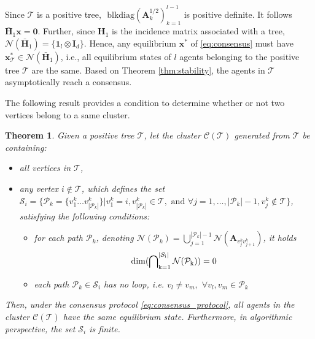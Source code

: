 \documentclass[draftclsnofoot,11pt,onecolumn]{IEEEtran}
\newtheorem{Theorem}{Theorem}
\newcommand{\m}[1]{\mathbf{#1}}
\newcommand{\mc}[1]{\mathcal{#1}}
\begin{document}
\begin{IEEEproof}
Since $\mc{T}$ is a positive tree, $\text{ blkdiag}(\m{A}_k^{{1}/{2}})_{k=1}^{l-1}$ is positive definite. It follows $\bar{\m{H}}_1\m{x} = \m{0}$. Further, since $\m{H}_1$ is the incidence matrix associated with a tree, $\mc{N}(\bar{\m{H}}_1) = \{ \m{1}_{l} \otimes \m{I}_{d} \}$. Hence, any equilibrium $\m{x}^*$ of \eqref{eq:consensus} must have $\m{x}_{\mc{T}}^* \in \mc{N}(\bar{\m{H}}_1)$, i.e., all equilibrium states of $l$ agents belonging to the positive tree $\mc{T}$ are the same. Based on Theorem \ref{thm:stability}, the agents in $\mc{T}$  asymptotically reach a consensus.
\end{IEEEproof}

The following result provides a condition to determine whether or not two vertices belong to a same cluster.
\begin{Theorem} \label{prop:cluster}
Given a positive tree $\mc{T}$, let the cluster $\mc{C}(\mc{T})$ generated from $\mc{T}$ be containing:
\begin{itemize}
\item[i.] all vertices in $\mc{T}$,
\item[ii.] any vertex $i \notin \mc{T}$, which defines the set $\mc{S}_i = \{ \mc{P}_k=\{v^k_1\ldots v^k_{|\mc{P}_k|}\} | v^k_1 = i, v^k_{|\mc{P}_k|}  \in \mc{T}, \text{ and } \forall j = 1,\ldots, {|\mc{P}_k|-1}, v^k_j \notin \mc{T} \}$, satisfying the following conditions:
\begin{itemize}
\item[a.] for each path $\mc{P}_k$, denoting $\mc{N}(\mc{P}_k) = \bigcup_{j=1}^{{|\mc{P}_k|-1}} \mc{N}( \m{A}_{v^k_jv^k_{j+1}})$, it holds
\begin{equation} \label{eq:same_cluster}
\rm{dim} (\bigcap\nolimits_{k=1}^{|\mc{S}_i|} \mc{N}(\mc{P}_k)) = 0
\end{equation}
\item[b.] each path $\mc{P}_{k} \in \mc{S}_i$ has no loop, i.e. $v_l \neq v_m,$ $\forall v_l, v_m \in \mc{P}_k$
\end{itemize}
\end{itemize}
Then, under the consensus protocol \eqref{eq:consensus_protocol}, all agents in the cluster $\mc{C}(\mc{T})$ have the same equilibrium state. Furthermore, in algorithmic perspective, the set $\mc{S}_i$ is finite.
\end{Theorem}
\end{document}
